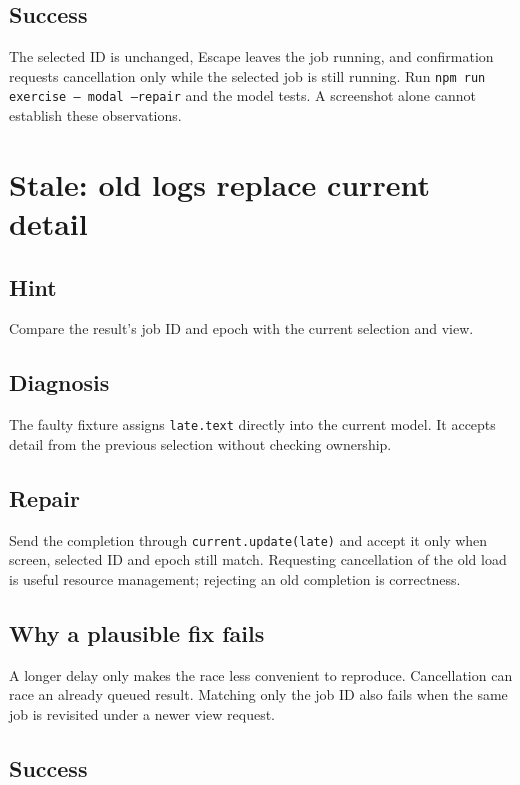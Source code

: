 \subsection{Success}

The selected ID is unchanged, Escape leaves the job running, and confirmation requests cancellation only while the selected job is still running. Run \texttt{npm run exercise -- modal --repair} and the model tests. A screenshot alone cannot establish these observations.

\section{Stale: old logs replace current detail}

\subsection{Hint}

Compare the result's job ID and epoch with the current selection and view.

\subsection{Diagnosis}

The faulty fixture assigns \texttt{late.text} directly into the current model. It accepts detail from the previous selection without checking ownership.

\subsection{Repair}

Send the completion through \texttt{current.update(late)} and accept it only when screen, selected ID and epoch still match. Requesting cancellation of the old load is useful resource management; rejecting an old completion is correctness.

\subsection{Why a plausible fix fails}

A longer delay only makes the race less convenient to reproduce. Cancellation can race an already queued result. Matching only the job ID also fails when the same job is revisited under a newer view request.

\subsection{Success}

